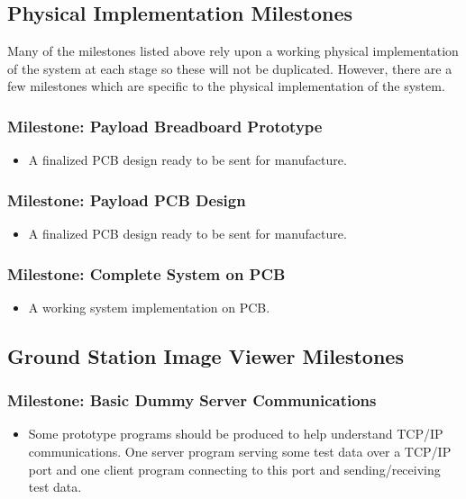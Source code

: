 \subsection{Physical Implementation Milestones}
Many of the milestones listed above rely upon a working physical implementation of the system at each stage
so these will not be duplicated. However, there are a few milestones which are specific to the physical implementation
of the system.



	\subsubsection{Milestone: Payload Breadboard Prototype}
		\label{sec:ms_phy_breadboard}
		\begin{itemize}
			\item A finalized PCB design ready to be sent for manufacture. 
		\end{itemize}

	\subsubsection{Milestone: Payload PCB Design}
		\label{sec:ms_phy_pcb_design}
		\begin{itemize}
			\item A finalized PCB design ready to be sent for manufacture. 
		\end{itemize}
		
	\subsubsection{Milestone: Complete System on PCB}
		\label{sec:ms_phy_pcb_complete}
		\begin{itemize}
			\item A working system implementation on PCB.
		\end{itemize}


\subsection{Ground Station Image Viewer Milestones}
	\subsubsection{Milestone: Basic Dummy Server Communications}
		\label{sec:ms_basic_dummy_server_comms}
		\begin{itemize}
			\item 	Some prototype programs should be produced to help understand TCP/IP communications.
				One server program serving some test data over a TCP/IP port and one
				client program connecting to this port and sending/receiving test data.
		\end{itemize}

